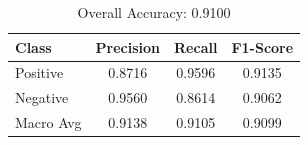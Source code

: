\begin{table}[ht]
\centering
\caption{Evaluation Results: DistilBERT on SST-2 Validation Set}
\label{tab:eval-results}
\begin{tabular}{lccc}
\toprule
Class & Precision & Recall & F1-Score \\
\midrule
Positive & 0.8716 & 0.9596 & 0.9135 \\
Negative & 0.9560 & 0.8614 & 0.9062 \\
Macro Avg & 0.9138 & 0.9105 & 0.9099 \\
\bottomrule
\end{tabular}
\caption*{Overall Accuracy: 0.9100}
\end{table}
